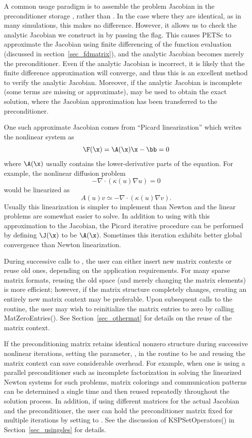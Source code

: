 A common usage paradigm is to assemble the problem Jacobian in the
preconditioner storage , rather than . In the case where they are
identical, as in many simulations, this makes no difference. However, it allows
us to check the analytic Jacobian we construct in  by
passing the  flag. This causes PETSc to approximate the
Jacobian using finite differencing of the function evaluation (discussed in
section~\ref{sec_fdmatrix}), and the analytic Jacobian becomes merely the
preconditioner. Even if the analytic Jacobian is incorrect, it is likely that
the finite difference approximation will converge, and thus this is an excellent
method to verify the analytic Jacobian. Moreover, if the analytic Jacobian is
incomplete (some terms are missing or approximate),  may
be used to obtain the exact solution, where the Jacobian approximation has been
transferred to the preconditioner.

One such approximate Jacobian comes from ``Picard linearization'' which writes the nonlinear system as
\[ \F(\x) = \A(\x) \x - \bb = 0 \]
where $\A(\x)$ usually contains the lower-derivative parts of the equation.
For example, the nonlinear diffusion problem
\[ - \nabla\cdot(\kappa(u) \nabla u) = 0 \]
would be linearized as
\[ A(u) v \simeq -\nabla\cdot(\kappa(u) \nabla v). \]
Usually this linearization is simpler to implement than Newton and the linear problems are somewhat easier to solve.
In addition to using  with this approximation to the Jacobian, the Picard iterative procedure can be performed by defining
$\J(\x)$ to be $\A(\x)$.
Sometimes this iteration exhibits better global convergence than Newton linearization.

During successive calls to , the user can either
insert new matrix contexts or reuse old ones, depending on the
application requirements. For many sparse matrix formats, reusing the
old space (and merely changing the matrix elements) is more efficient;
however, if the matrix structure completely changes, creating an
entirely new matrix context may be preferable.
Upon subsequent calls to the
 routine, the user may wish to reinitialize the matrix
entries to zero by calling MatZeroEntries().  See
Section~\ref{sec_othermat} for details on the reuse of the matrix
context.

If the preconditioning matrix retains identical nonzero structure
during successive nonlinear iterations, setting the parameter, ,
in the  routine to be 
 and reusing the matrix context can save
considerable overhead.  For example, when one is using a parallel
preconditioner such as incomplete factorization in solving the
linearized Newton systems for such problems, matrix colorings and
communication patterns can be determined a single time and then reused
repeatedly throughout the solution process.  In addition, if using
different matrices for the actual Jacobian and the preconditioner, the
user can hold the preconditioner matrix fixed for multiple iterations
by setting  to .  See the
discussion of KSPSetOperators() in Section~\ref{sec_usingsles} for
details.

